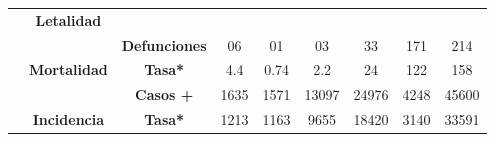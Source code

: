 \begin{tabular}{ccc|cccccc|}
		&\multicolumn{1}{c|}{\multirow{-2}{*}{\cellcolor[HTML]{E2EFDA}\textbf{Letalidad}}}&\cellcolor[HTML]{E2EFDA} 
		&\multicolumn{1}{c|}{\cellcolor[HTML]{E2EFDA}} 
		&\multicolumn{1}{c|}{\cellcolor[HTML]{E2EFDA}} 
		&\multicolumn{1}{c|}{\cellcolor[HTML]{E2EFDA}} 
		&\multicolumn{1}{c|}{\cellcolor[HTML]{E2EFDA}} 
		&\multicolumn{1}{c|}{\cellcolor[HTML]{E2EFDA}} 
		&\cellcolor[HTML]{E2EFDA} \\ \cline{2-2}
		\rowcolor[HTML]{E2EFDA} 
		\multicolumn{1}{|c|}{\cellcolor[HTML]{E2EFDA}} 
		&\multicolumn{1}{c|}{\cellcolor[HTML]{E2EFDA}} 
		&\multirow{-2}{*}{\cellcolor[HTML]{E2EFDA}\textbf{Defunciones}} 
		&\multicolumn{1}{c|}{\multirow{-2}{*}{\cellcolor[HTML]{E2EFDA}06}} 
		&\multicolumn{1}{c|}{\multirow{-2}{*}{\cellcolor[HTML]{E2EFDA}01}} 
		&\multicolumn{1}{c|}{\multirow{-2}{*}{\cellcolor[HTML]{E2EFDA}03}} 
		&\multicolumn{1}{c|}{\multirow{-2}{*}{\cellcolor[HTML]{E2EFDA}33}} 
		&\multicolumn{1}{c|}{\multirow{-2}{*}{\cellcolor[HTML]{E2EFDA}171}} 
		&\multirow{-2}{*}{\cellcolor[HTML]{E2EFDA}214} \\ \cline{3-9} 
		\rowcolor[HTML]{E2EFDA} 
		\multicolumn{1}{|c|}{\cellcolor[HTML]{E2EFDA}} &
		\multicolumn{1}{c|}{\multirow{-2}{*}{\cellcolor[HTML]{E2EFDA}\textbf{Mortalidad}}}&\textbf{Tasa*} 
		&\multicolumn{1}{c|}{\cellcolor[HTML]{E2EFDA}4.4} 
		&\multicolumn{1}{c|}{\cellcolor[HTML]{E2EFDA}0.74} 
		&\multicolumn{1}{c|}{\cellcolor[HTML]{E2EFDA}2.2} 
		&\multicolumn{1}{c|}{\cellcolor[HTML]{E2EFDA}24} 
		&\multicolumn{1}{c|}{\cellcolor[HTML]{E2EFDA}122} 
		&158 \\ \cline{2-9} 
		\rowcolor[HTML]{E2EFDA} 
		\multicolumn{1}{|c|}{\cellcolor[HTML]{E2EFDA}} &
		\multicolumn{1}{c|}{\cellcolor[HTML]{E2EFDA}} &
		\textbf{Casos +} &
		\multicolumn{1}{c|}{\cellcolor[HTML]{E2EFDA}1635} &
		\multicolumn{1}{c|}{\cellcolor[HTML]{E2EFDA}1571} &
		\multicolumn{1}{c|}{\cellcolor[HTML]{E2EFDA}13097} &
		\multicolumn{1}{c|}{\cellcolor[HTML]{E2EFDA}24976} &
		\multicolumn{1}{c|}{\cellcolor[HTML]{E2EFDA}4248} &
		45600 \\ \cline{3-9} 
		\rowcolor[HTML]{E2EFDA} 
		\multicolumn{1}{|c|}{\multirow{-6}{*}{\cellcolor[HTML]{E2EFDA}\textbf{2022}}} &
		\multicolumn{1}{c|}{\multirow{-2}{*}{\cellcolor[HTML]{E2EFDA}\textbf{Incidencia}}} &
		\textbf{Tasa*} &
		\multicolumn{1}{c|}{\cellcolor[HTML]{E2EFDA}1213} &
		\multicolumn{1}{c|}{\cellcolor[HTML]{E2EFDA}1163} &
		\multicolumn{1}{c|}{\cellcolor[HTML]{E2EFDA}9655} &
		\multicolumn{1}{c|}{\cellcolor[HTML]{E2EFDA}18420} &
		\multicolumn{1}{c|}{\cellcolor[HTML]{E2EFDA}3140} &
		33591 \\ \hline
	\end{tabular}
